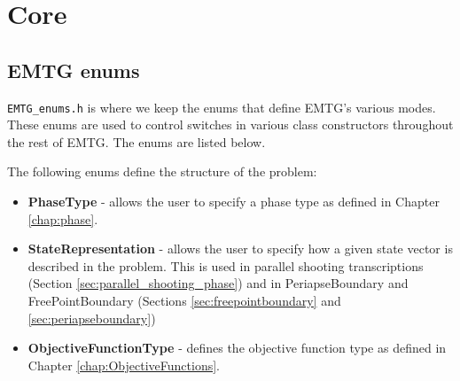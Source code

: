 







\chapter{Core}
\label{chap:core}

\section{EMTG enums}
\label{sec:EMTG_enums}

\texttt{EMTG\_enums.h} is where we keep the enums that define EMTG's various modes. These enums are used to control switches in various class constructors throughout the rest of EMTG. The enums are listed below.

The following enums define the structure of the problem:
\begin{itemize}
	\item \textbf{PhaseType} - allows the user to specify a phase type as defined in Chapter \ref{chap:phase}.
	\item \textbf{StateRepresentation} - allows the user to specify how a given state vector is described in the problem. This is used in parallel shooting transcriptions (Section \ref{sec:parallel_shooting_phase}) and in PeriapseBoundary and FreePointBoundary (Sections \ref{sec:freepointboundary} and \ref{sec:periapseboundary})
	\item \textbf{ObjectiveFunctionType} - defines the objective function type as defined in Chapter \ref{chap:ObjectiveFunctions}.
\end{itemize}

